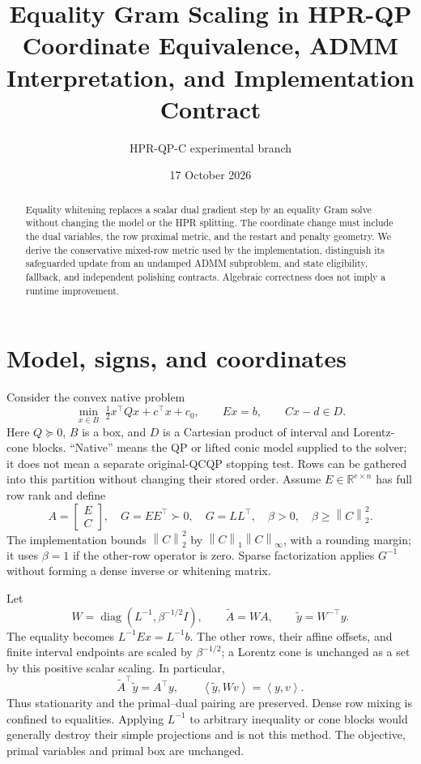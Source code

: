 \documentclass[11pt]{article}
\title{Equality Gram Scaling in HPR-QP\\Coordinate Equivalence, ADMM Interpretation, and Implementation Contract}
\author{HPR-QP-C experimental branch}
\date{17 October 2026}
\newcommand{\R}{\mathbb R}
\newcommand{\norm}[1]{\left\lVert#1\right\rVert}
\newcommand{\ip}[2]{\left\langle#1,#2\right\rangle}
\begin{document}
\maketitle
\begin{abstract}
Equality whitening replaces a scalar dual gradient step by an equality Gram
solve without changing the model or the HPR splitting. The coordinate change
must include the dual variables, the row proximal metric, and the restart and
penalty geometry. We derive the conservative mixed-row metric used by the
implementation, distinguish its safeguarded update from an undamped ADMM
subproblem, and state eligibility, fallback, and independent polishing contracts.
Algebraic correctness does not imply a runtime improvement.
\end{abstract}

\section{Model, signs, and coordinates}
Consider the convex native problem
\begin{equation}\label{eq:model}
 \min_{x\in B}\;\tfrac12 x^\top Qx+c^\top x+c_0,
 \qquad Ex=b,\qquad Cx-d\in D.
\end{equation}
Here $Q\succeq0$, $B$ is a box, and $D$ is a Cartesian product of interval and
Lorentz-cone blocks. ``Native'' means the QP or lifted conic model supplied to
the solver; it does not mean a separate original-QCQP stopping test. Rows can
be gathered into this partition without changing their stored order. Assume
$E\in\R^{e\times n}$ has full row rank and define
\[
 A=\begin{bmatrix}E\\C\end{bmatrix},\quad
 G=EE^\top\succ0,\quad G=LL^\top,\quad
 \beta>0,\quad\beta\ge\norm{C}_2^2.
\]
The implementation bounds $\norm{C}_2^2$ by
$\norm{C}_1\norm{C}_\infty$, with a rounding margin; it uses $\beta=1$ if the
other-row operator is zero. Sparse factorization applies $G^{-1}$ without
forming a dense inverse or whitening matrix.

Let
\begin{equation}\label{eq:W}
 W=\operatorname{diag}(L^{-1},\beta^{-1/2}I),\qquad
 \widetilde A=WA,\qquad \widetilde y=W^{-\top}y.
\end{equation}
The equality becomes $L^{-1}Ex=L^{-1}b$. The other rows, their affine offsets,
and finite interval endpoints are scaled by $\beta^{-1/2}$; a Lorentz cone is
unchanged as a set by this positive scalar scaling. In particular,
\[
 \widetilde A^\top\widetilde y=A^\top y,\qquad
 \ip{\widetilde y}{Wv}=\ip{y}{v}.
\]
Thus stationarity and the primal--dual pairing are preserved. Dense row mixing
is confined to equalities. Applying $L^{-1}$ to arbitrary inequality or cone
blocks would generally destroy their simple projections and is not this method.
The objective, primal variables and primal box are unchanged.
\end{document}
